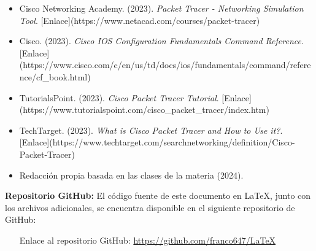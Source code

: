 \documentclass[a4paper,12pt]{article}
\begin{document}
\begin{itemize}
    \item Cisco Networking Academy. (2023). 
    \textit{Packet Tracer - Networking Simulation Tool}. [Enlace](https://www.netacad.com/courses/packet-tracer)
    \item Cisco. (2023). 
    \textit{Cisco IOS Configuration Fundamentals Command Reference}. [Enlace](https://www.cisco.com/c/en/us/td/docs/ios/fundamentals/command/reference/cf_book.html)
    \item TutorialsPoint. (2023). 
    \textit{Cisco Packet Tracer Tutorial}. [Enlace](https://www.tutorialspoint.com/cisco_packet_tracer/index.htm)
    \item TechTarget. (2023). 
    \textit{What is Cisco Packet Tracer and How to Use it?}. [Enlace](https://www.techtarget.com/searchnetworking/definition/Cisco-Packet-Tracer)
    \item Redacción propia basada en las clases de la materia (2024). 
\end{itemize}
\textbf{Repositorio GitHub:} El código fuente de este documento en LaTeX, junto con los archivos adicionales, se encuentra disponible en el siguiente repositorio de GitHub:
\begin{itemize}
    \item [Enlace al repositorio GitHub: \url{https://github.com/franco647/LaTeX}]
\end{itemize}
\end{document}
